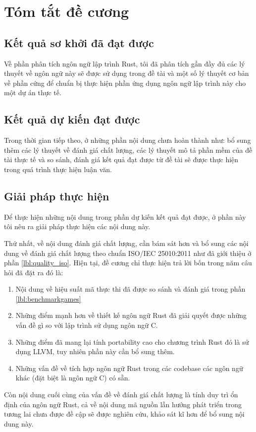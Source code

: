 \chapter{Tóm tắt đề cương}
\section{Kết quả sơ khởi đã đạt được}
Về phần phân tích ngôn ngữ lập trình Rust, tôi đã phân tích gần đầy đủ các lý thuyết về ngôn ngữ này sẽ được sử dụng trong đề tài và một số lý thuyết cơ bản về phần cứng để chuẩn bị thực hiện phần ứng dụng ngôn ngữ lập trình này cho một dự án thực tế.
\section{Kết quả dự kiến đạt được}
Trong thời gian tiếp theo, ở những phần nội dung chưa hoàn thành như: bổ sung thêm các lý thuyết về đánh giá chất lượng, các lý thuyết mô tả phần mềm của đề tài thực tế và so sánh, đánh giá kết quả đạt được từ đề tài sẽ được thực hiện trong quá trình thực hiện luận văn.
\section{Giải pháp thực hiện}
Để thực hiện những nội dung trong phần dự kiến kết quả đạt được, ở phần này tôi nêu ra giải pháp thực hiện các nội dung này.

Thứ nhất, về nội dung đánh giá chất lượng, cần bám sát hơn và bổ sung các nội dung về đánh giá chất lượng theo chuẩn ISO/IEC 25010:2011 như đã giới thiệu ở phần \ref{lbl:quality_iso}.
Hiện tại, đề cương chỉ thực hiện trả lời bốn trong năm câu hỏi đã đặt ra đó là:
\begin{enumerate}
\item Nội dung về hiệu suất mã thực thi đã được so sánh và đánh giá trong phần \ref{lbl:benchmarkgames}
\item Những điểm mạnh hơn về thiết kế ngôn ngữ Rust đã giải quyết được những vấn đề gì so với lập trình sử dụng ngôn ngữ C.
\item Những điểm đã mang lại tính portability cao cho chương trình Rust đó là sử dụng LLVM, tuy nhiên phần này cần bổ sung thêm.
\item Những vấn đề về tích hợp ngôn ngữ Rust trong các codebase các ngôn ngữ khác (đặt biệt là ngôn ngữ C) có sẵn.
\end{enumerate}
Còn nội dung cuối cùng của vấn đề về đánh giá chất lượng là tính duy trì ổn định của ngôn ngữ Rust, cả về nội dung mã nguồn lẫn hướng phát triển trong tương lai chưa được đề cập sẽ được nghiên cứu, khảo sát kĩ hơn để bổ sung nội dung này.

